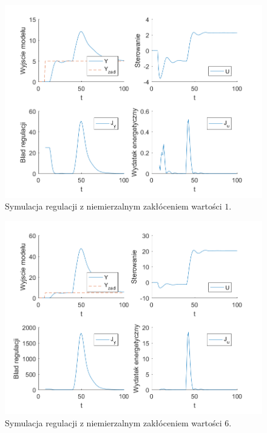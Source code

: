 \documentclass[a4paper, 10pt]{article}
\begin{document}
		\begin{figure}[H]
		\centering
		\includegraphics[width=0.9\linewidth]{z5}
		\caption{Symulacja regulacji z niemierzalnym zakłóceniem wartości $1$.}
		\label{fig:z5}
		\end{figure} 
			\begin{figure}[H]
				\centering
				\includegraphics[width=0.9\linewidth]{z56}
				\caption{Symulacja regulacji z niemierzalnym zakłóceniem wartości $6$.}
				\label{fig:z56}
				\end{figure} 
				
				
\end{document}
